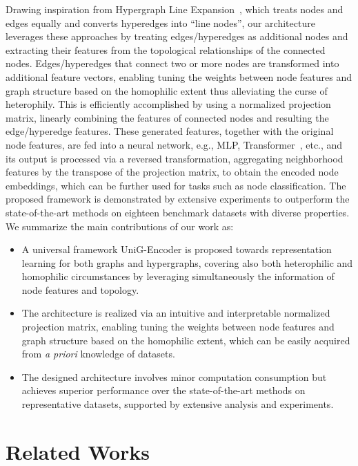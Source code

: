 \documentclass[review]{elsarticle}
\begin{document}
Drawing inspiration from Hypergraph Line Expansion~\cite{yang2022semi}, which treats nodes and edges equally and converts hyperedges into ``line nodes'', our architecture leverages these approaches by treating edges/hyperedges as additional nodes and extracting their features from the topological relationships of the connected nodes. Edges/hyperedges that connect two or more nodes are transformed into additional feature vectors, enabling tuning the weights between node features and graph structure based on the homophilic extent thus alleviating the curse of heterophily. This is efficiently accomplished by using a normalized projection matrix, linearly combining the features of connected nodes and resulting the edge/hyperedge features. These generated features, together with the original node features, are fed into a neural network, e.g., MLP, Transformer~\cite{vaswani2017attention}, etc., and its output is processed via a reversed transformation, aggregating neighborhood features by the transpose of the projection matrix, to obtain the encoded node embeddings, which can be further used for tasks such as node classification. The proposed framework is demonstrated by extensive experiments to outperform the state-of-the-art methods on eighteen benchmark datasets with diverse properties. We summarize the main contributions of our work as:
\begin{itemize}
\item A universal framework UniG-Encoder is proposed towards representation learning for both graphs and hypergraphs, covering also both heterophilic and homophilic circumstances by leveraging simultaneously the information of node features and topology.
\item The architecture is realized via an intuitive and interpretable normalized projection matrix, enabling tuning the weights between node features and graph structure based on the homophilic extent, which can be easily acquired from \textit{a priori} knowledge of datasets.
\item The designed architecture involves minor computation consumption but achieves superior performance over the state-of-the-art methods on representative datasets, supported by extensive analysis and experiments.
\end{itemize}

\section{Related Works}
\end{document}

